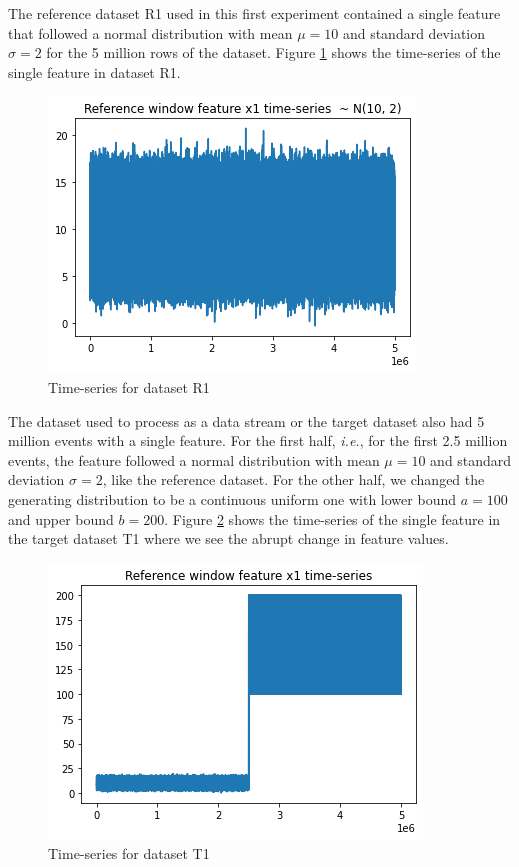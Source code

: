 The reference dataset R1 used in this first experiment contained a single feature that followed a normal distribution with mean $\mu=10$ and standard deviation $\sigma=2$ for the 5 million rows of the dataset. Figure \ref{fig:timeseries-r1} shows the time-series of the single feature in dataset R1.
\begin{figure}[!htb]
    \begin{center}
      \includegraphics[scale=0.6]{figures/01-reference.png}
      \caption[]{Time-series for dataset R1}
      \label{fig:timeseries-r1}
    \end{center}
\end{figure}
The dataset used to process as a data stream or the target dataset also had 5 million events with a single feature. For the first half, \textit{i.e.}, for the first 2.5 million events, the feature followed a normal distribution with mean $\mu=10$ and standard deviation $\sigma=2$, like the reference dataset. For the other half, we changed the generating distribution to be a continuous uniform one with lower bound $a=100$ and upper bound $b=200$. Figure \ref{fig:timeseries-t1} shows the time-series of the single feature in the target dataset T1 where we see the abrupt change in feature values.
\begin{figure}[!htb]
    \begin{center}
      \includegraphics[scale=0.6]{figures/01-target.png}
      \caption[]{Time-series for dataset T1}
      \label{fig:timeseries-t1}
    \end{center}
\end{figure}

